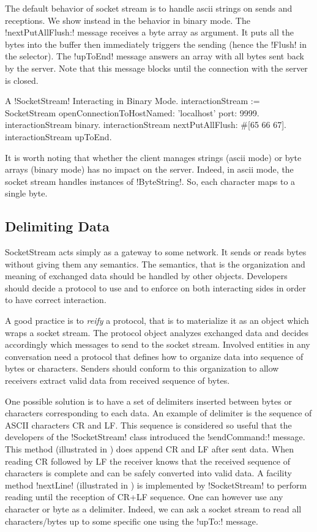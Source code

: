 \documentclass[a4paper,10pt,twoside]{book}
\begin{document}
The default behavior of socket stream is to handle ascii strings on sends and receptions.
We show instead in  the behavior in binary mode.
The \ct!nextPutAllFlush:! message receives a byte array as argument.
It puts all the bytes into the buffer then immediately triggers the sending (hence the \ct!Flush! in the selector).
The \ct!upToEnd! message answers an array with all bytes sent back by the server.
Note that this message blocks until the connection with the server is closed.


\begin{script}{A \ct!SocketStream! Interacting in Binary Mode.}
interactionStream := SocketStream 
									openConnectionToHostNamed: 'localhost' port: 9999.  
interactionStream binary.
interactionStream nextPutAllFlush: #[65 66 67].
interactionStream upToEnd.
\end{script}

It is worth noting that whether the client manages strings (ascii mode) or byte arrays (binary mode) has no impact on the server.
Indeed, in ascii mode, the socket stream handles instances of \ct!ByteString!.
So, each character maps to a single byte. 

\subsection{Delimiting Data}
SocketStream acts simply as a gateway to some network. 
It sends or reads bytes without giving them any semantics.
The semantics, that is the organization and meaning of exchanged data should be handled by other objects.
Developers should decide a protocol to use and to enforce on both interacting sides in order to have correct interaction.

A good practice is to \emph{reify} a protocol, that is to materialize it as an object which wraps a socket stream. 
The protocol object analyzes exchanged data and decides accordingly which messages to send to the socket stream.
Involved entities in any conversation need a protocol that defines how to organize data into sequence of bytes or characters.
Senders should conform to this organization to allow receivers extract valid data from received sequence of bytes.
 
One possible solution is to have a set of delimiters inserted between bytes or characters corresponding to each data.
An example of delimiter is the sequence of ASCII characters CR and LF.
This sequence is considered so useful that the developers of the \ct!SocketStream! class introduced the \ct!sendCommand:! message.
This method (illustrated in ) does append CR and LF after sent data.
When reading CR followed by LF the receiver knows that the received sequence of characters is complete and can be safely converted into valid data.
A facility method \ct!nextLine! (illustrated in ) is implemented by \ct!SocketStream! to perform reading until the reception of CR+LF sequence.
One can however use any character or byte as a delimiter.
Indeed, we can ask a socket stream to read all characters/bytes up to some specific one using the \ct!upTo:! message.
\end{document}
